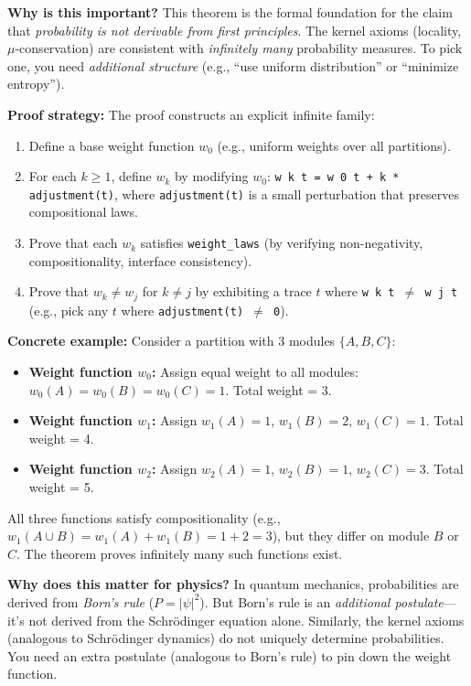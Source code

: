 \textbf{Why is this important?} This theorem is the formal foundation for the claim that \textit{probability is not derivable from first principles}. The kernel axioms (locality, $\mu$-conservation) are consistent with \textit{infinitely many} probability measures. To pick one, you need \textit{additional structure} (e.g., ``use uniform distribution'' or ``minimize entropy'').

\textbf{Proof strategy:} The proof constructs an explicit infinite family:
\begin{enumerate}
    \item Define a base weight function $w_0$ (e.g., uniform weights over all partitions).
    \item For each $k \geq 1$, define $w_k$ by modifying $w_0$: \texttt{w k t = w 0 t + k * adjustment(t)}, where \texttt{adjustment(t)} is a small perturbation that preserves compositional laws.
    \item Prove that each $w_k$ satisfies \texttt{weight\_laws} (by verifying non-negativity, compositionality, interface consistency).
    \item Prove that $w_k \neq w_j$ for $k \neq j$ by exhibiting a trace $t$ where \texttt{w k t $\neq$ w j t} (e.g., pick any $t$ where \texttt{adjustment(t) $\neq$ 0}).
\end{enumerate}

\textbf{Concrete example:}
Consider a partition with 3 modules $\{A, B, C\}$:
\begin{itemize}
    \item \textbf{Weight function $w_0$:} Assign equal weight to all modules: $w_0(A) = w_0(B) = w_0(C) = 1$. Total weight = 3.
    \item \textbf{Weight function $w_1$:} Assign $w_1(A) = 1$, $w_1(B) = 2$, $w_1(C) = 1$. Total weight = 4.
    \item \textbf{Weight function $w_2$:} Assign $w_2(A) = 1$, $w_2(B) = 1$, $w_2(C) = 3$. Total weight = 5.
\end{itemize}
All three functions satisfy compositionality (e.g., $w_1(A \cup B) = w_1(A) + w_1(B) = 1 + 2 = 3$), but they differ on module $B$ or $C$. The theorem proves infinitely many such functions exist.

\textbf{Why does this matter for physics?} In quantum mechanics, probabilities are derived from \textit{Born's rule} ($P = |\psi|^2$). But Born's rule is an \textit{additional postulate}---it's not derived from the Schr\"odinger equation alone. Similarly, the kernel axioms (analogous to Schr\"odinger dynamics) do not uniquely determine probabilities. You need an extra postulate (analogous to Born's rule) to pin down the weight function.

